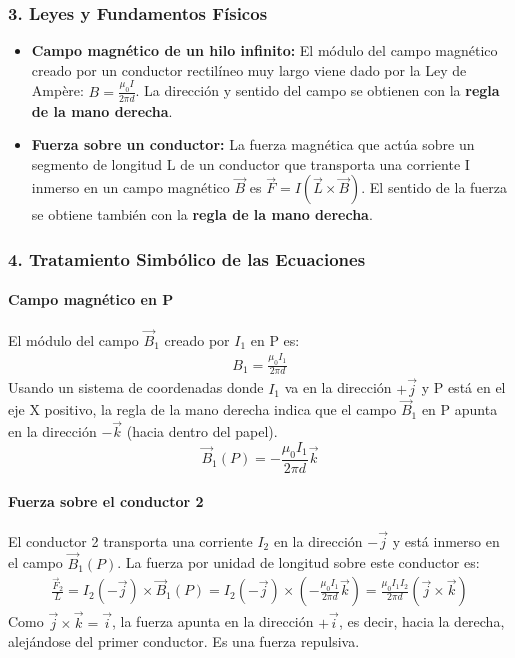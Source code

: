 \subsubsection*{3. Leyes y Fundamentos Físicos}
\begin{itemize}
    \item \textbf{Campo magnético de un hilo infinito:} El módulo del campo magnético creado por un conductor rectilíneo muy largo viene dado por la Ley de Ampère: $B = \frac{\mu_0 I}{2\pi d}$. La dirección y sentido del campo se obtienen con la \textbf{regla de la mano derecha}.
    \item \textbf{Fuerza sobre un conductor:} La fuerza magnética que actúa sobre un segmento de longitud L de un conductor que transporta una corriente I inmerso en un campo magnético $\vec{B}$ es $\vec{F} = I (\vec{L} \times \vec{B})$. El sentido de la fuerza se obtiene también con la \textbf{regla de la mano derecha}.
\end{itemize}

\subsubsection*{4. Tratamiento Simbólico de las Ecuaciones}
\paragraph{Campo magnético en P}
El módulo del campo $\vec{B}_1$ creado por $I_1$ en P es:
\begin{gather}
    B_1 = \frac{\mu_0 I_1}{2\pi d}
\end{gather}
Usando un sistema de coordenadas donde $I_1$ va en la dirección $+\vec{j}$ y P está en el eje X positivo, la regla de la mano derecha indica que el campo $\vec{B}_1$ en P apunta en la dirección $-\vec{k}$ (hacia dentro del papel).
$$ \vec{B}_1(P) = -\frac{\mu_0 I_1}{2\pi d} \vec{k} $$
\paragraph{Fuerza sobre el conductor 2}
El conductor 2 transporta una corriente $I_2$ en la dirección $-\vec{j}$ y está inmerso en el campo $\vec{B}_1(P)$. La fuerza por unidad de longitud sobre este conductor es:
\begin{gather}
    \frac{\vec{F}_2}{L} = I_2 (-\vec{j}) \times \vec{B}_1(P) = I_2 (-\vec{j}) \times \left( -\frac{\mu_0 I_1}{2\pi d} \vec{k} \right) = \frac{\mu_0 I_1 I_2}{2\pi d} (\vec{j} \times \vec{k})
\end{gather}
Como $\vec{j} \times \vec{k} = \vec{i}$, la fuerza apunta en la dirección $+\vec{i}$, es decir, hacia la derecha, alejándose del primer conductor. Es una fuerza repulsiva.

